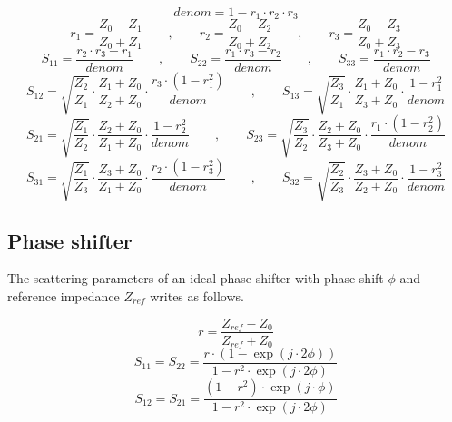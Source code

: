 \documentclass[10pt]{report}
\begin{document}
\begin{equation}
denom = 1-r_1\cdot r_2\cdot r_3
\end{equation}
\begin{equation}
r_1 = \frac{Z_0-Z_1}{Z_0+Z_1} \qquad,\qquad 
r_2 = \frac{Z_0-Z_2}{Z_0+Z_2} \qquad,\qquad 
r_3 = \frac{Z_0-Z_3}{Z_0+Z_3}
\end{equation}
\begin{equation}
S_{11} = \frac{r_2\cdot r_3 - r_1}{denom} \qquad,\qquad 
S_{22} = \frac{r_1\cdot r_3 - r_2}{denom} \qquad,\qquad 
S_{33} = \frac{r_1\cdot r_2 - r_3}{denom}
\end{equation}
\begin{equation}
S_{12} = \sqrt{\frac{Z_2}{Z_1}}\cdot\frac{Z_1+Z_0}{Z_2+Z_0}\cdot\frac{r_3\cdot(1-r_1^2)}{denom}
\qquad,\qquad 
S_{13} = \sqrt{\frac{Z_3}{Z_1}}\cdot\frac{Z_1+Z_0}{Z_3+Z_0}\cdot\frac{1-r_1^2}{denom}
\end{equation}
\begin{equation}
S_{21} = \sqrt{\frac{Z_1}{Z_2}}\cdot\frac{Z_2+Z_0}{Z_1+Z_0}\cdot\frac{1-r_2^2}{denom}
\qquad,\qquad 
S_{23} = \sqrt{\frac{Z_3}{Z_2}}\cdot\frac{Z_2+Z_0}{Z_3+Z_0}\cdot\frac{r_1\cdot(1-r_2^2)}{denom}
\end{equation}
\begin{equation}
S_{31} = \sqrt{\frac{Z_1}{Z_3}}\cdot\frac{Z_3+Z_0}{Z_1+Z_0}\cdot\frac{r_2\cdot(1-r_3^2)}{denom}
\qquad,\qquad 
S_{32} = \sqrt{\frac{Z_2}{Z_3}}\cdot\frac{Z_3+Z_0}{Z_2+Z_0}\cdot\frac{1-r_3^2}{denom}
\end{equation}

\subsection{Phase shifter}

The scattering parameters of an ideal phase shifter with phase shift
$\phi$ and reference impedance $Z_{ref}$ writes as follows.

\begin{equation}
r = \frac{Z_{ref}-Z_0}{Z_{ref}+Z_0}
\end{equation}
\begin{equation}
S_{11} = S_{22} = \frac{r\cdot\left(1-\exp(j\cdot 2\phi)\right)}{1-r^2\cdot\exp(j\cdot 2\phi)}
\end{equation}
\begin{equation}
S_{12} = S_{21} = \frac{(1-r^2)\cdot\exp(j\cdot\phi)}{1-r^2\cdot\exp(j\cdot 2\phi)}
\end{equation}
\end{document}
